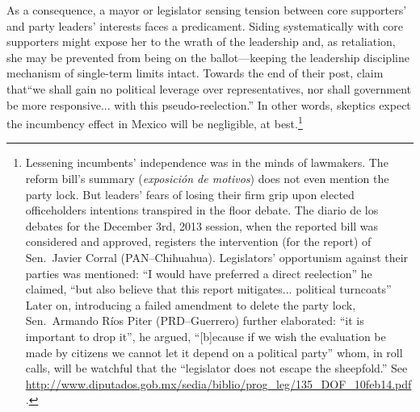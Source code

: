 \documentclass[letter,12pt]{article}
\begin{document}
As a consequence, a mayor or legislator sensing tension between core supporters' and party leaders' interests faces a predicament. Siding systematically with core supporters might expose her to the wrath of the leadership and, as retaliation, she may be prevented from being on the ballot---keeping the leadership discipline mechanism of single-term limits \citep{weldon.1997} intact. Towards the end of their post, \citet{merinoFierroZarkin2013Blog} claim that``we shall gain no political leverage over representatives, nor shall government be more responsive... with this pseudo-reelection.'' In other words, skeptics expect the incumbency effect in Mexico will be negligible, at best.\footnote{Lessening incumbents' independence was in the minds of lawmakers. The reform bill's summary (\emph{exposición de motivos}) does not even mention the party lock. But leaders' fears of losing their firm grip upon elected officeholders intentions transpired in the floor debate. The diario de los debates for the December 3rd, 2013 session, when the reported bill was considered and approved, registers the intervention (for the report) of Sen.\ Javier Corral (PAN--Chihuahua). Legislators' opportunism against their parties was mentioned: ``I would have preferred a direct reelection'' he claimed, ``but also believe that this report mitigates... political turncoats'' Later on, introducing a failed amendment to delete the party lock, Sen.\ Armando Ríos Piter (PRD--Guerrero) further elaborated: ``it is important to drop it'', he argued, ``[b]ecause if we wish the evaluation be made by citizens we cannot let it depend on a political party'' whom, in roll calls, will be watchful that the ``legislator does not escape the sheepfold.'' See \url{http://www.diputados.gob.mx/sedia/biblio/prog_leg/135_DOF_10feb14.pdf}.}



\end{document}
